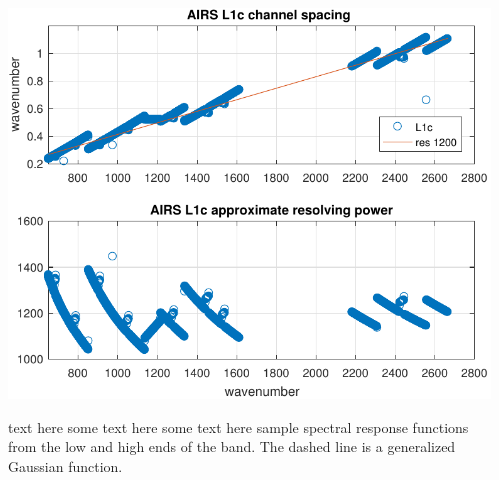 \begin{frame}
\begin{columns}[t]
\begin{column}{0.5\textwidth}
\end{column}
\begin{column}{0.5\textwidth}  
    \begin{center}
      \includegraphics[width=\textwidth]{figures/airs_L1c_res.pdf}
     \end{center}
text here some text here some text here sample {\airs} spectral
response functions from the low and high ends of the band.  The
dashed line is a generalized Gaussian function.
\end{column}
\end{columns}
\end{frame} %
